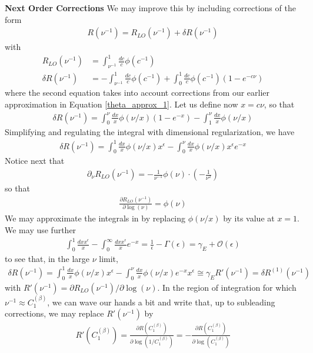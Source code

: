 \textbf{Next Order Corrections}
We may improve this by including corrections of the form
\begin{align}
    R(\nu^{-1}) = R_{LO}(\nu^{-1}) + \delta R(\nu^{-1})
\end{align}
with
\begin{align}
    R_{LO}(\nu^{-1}) &= \int_{\nu^{-1}}^1 \frac{dc}{c} \phi(c^{-1})
    \\
    \delta R(\nu^{-1}) &= -\int_{\nu^{-1}}^1 \frac{dc}{c} \phi(c^{-1}) + \int_0^1 \frac{dc}{c} \phi(c^{-1}) \left( 1 - e^{-c \nu} \right)
\end{align}
where the second equation takes into account corrections from our earlier approximation in Equation \ref{theta_approx_1}.
Let us define now \(x = c \nu\), so that
\begin{align}
    \delta R(\nu^{-1}) = \int_0^{\nu} \frac{dx}{x} \phi(\nu/x) \left( 1 - e^{-x}\right) - \int_1^\nu \frac{dx}{x} \phi(\nu/x)
\end{align}
Simplifying and regulating the integral with dimensional regularization, we have
\begin{align}
    \delta R(\nu^{-1}) = \int_0^{1} \frac{dx}{x} \phi(\nu/x) x^\epsilon - \int_0^\nu \frac{dx}{x} \phi(\nu/x) x^\epsilon e^{-x}
    \label{eq:nextorderintegrals}
\end{align}
Notice next that
\begin{align}
    \partial_\nu R_{LO}(\nu^{-1}) =  -\frac{1}{\nu^{-1}} \phi(\nu) \cdot (-\frac{1}{\nu^2})
\end{align}
so that
\begin{align}
    \frac{\partial R_{LO}(\nu^{-1})}{\partial \log(\nu)} = \phi(\nu)
\end{align}
We may approximate the integrals in  by replacing \(\phi(\nu/x)\) by its value at \(x = 1\). We may use further
\begin{align}
    \int_0^1\frac{dx x^\epsilon}{x} - \int_0^\infty\frac{dx x^\epsilon}{x}e^{-x} = \frac{1}{\epsilon} - \Gamma(\epsilon) = \gamma_E + \mathcal{O}(\epsilon)
    \label{eq:dimregint1}
\end{align}
to see that, in the large \(\nu\) limit,
\begin{align}
    \delta R(\nu^{-1}) = \int_0^{1} \frac{dx}{x} \phi(\nu/x) x^\epsilon - \int_0^\nu \frac{dx}{x} \phi(\nu/x) e^{-x} x^\epsilon \cong \gamma_E R'(\nu^{-1}) = \delta R^{(1)}(\nu^{-1})
\end{align}
with \(R'(\nu^{-1}) = \partial R_{LO}(\nu^{-1}) / \partial \log(\nu)\). In the region of integration for which \(\nu^{-1}\approx C_1^{(\beta)}\), we can wave our hands a bit and write that, up to subleading corrections, we may replace \(R'(\nu^{-1})\) by
\begin{align}
    R'(C_1^{(\beta)}) = \frac{\partial R (C_1^{(\beta)})}{\partial \log(1/C_1^{(\beta)})} = -\frac{\partial R (C_1^{(\beta)})}{\partial \log(C_1^{(\beta)})}
\end{align}

